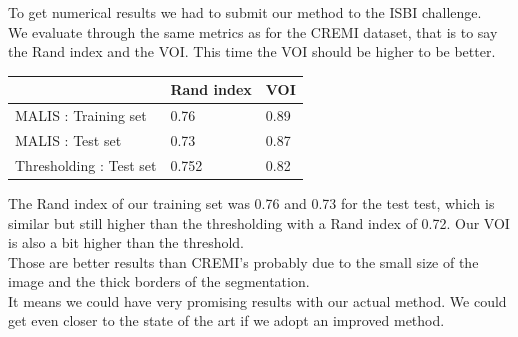To get numerical results we had to submit our method to the ISBI challenge.\\
We evaluate through the same metrics as for the CREMI dataset, that is to say the Rand index and the VOI.
This time the VOI should be higher to be better.\\

\begin{center}
	\begin{tabular}{lll}
		\hline
		& Rand index & VOI \\
		\hline
		MALIS : Training set & 0.76 & 0.89\\
		MALIS : Test set & 0.73 & 0.87\\
		Thresholding : Test set & 0.752 & 0.82\\
	\end{tabular}
\end{center}

The Rand index of our training set was 0.76 and 0.73 for the test test, which is similar but still higher than the thresholding with a Rand index of 0.72.
Our VOI is also a bit higher than the threshold.\\
Those are better results than CREMI's probably due to the small size of the image and the thick borders of the segmentation.\\ 
It means we could have very promising results with our actual method.
We could get even closer to the state of the art if we adopt an improved method.\\


